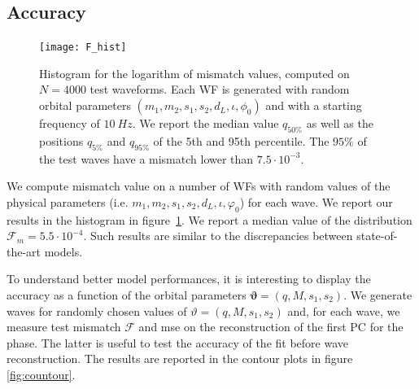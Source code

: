 \subsection{Accuracy}
\begin{figure}
	\centering
    \texttt{[image: F\_hist]}
	\caption{Histogram for the logarithm of mismatch values, computed on $N=4000$ test waveforms. Each WF is generated with random orbital parameters $(m_1,m_2, s_1, s_2, d_L, \iota, \phi_0)$ and with a starting frequency of $\SI{10}{Hz}$.
We report the median value $q_{50\%}$ as well as the positions $q_{5\%}$ and $q_{95\%}$ of the 5th and 95th percentile.
The $95\%$ of the test waves have a mismatch lower than $7.5 \cdot 10^{-3}$.
}
	\label{fig:F_hist}
\end{figure}
We compute mismatch value on a number of WFs with random values of the physical parameters (i.e. $m_1,m_2, s_1, s_2, d_L, \iota, \varphi_0$) for each wave.
We report our results in the histogram in figure~\ref{fig:F_hist}.
We report a median value of the distribution $\mathcal{F}_m = 5.5 \cdot {10^{-4}}$. Such results are similar to the discrepancies between state-of-the-art models.
\par
To understand better model performances, it is interesting to display the accuracy as a function of the orbital parameters $\boldsymbol{\vartheta} = (q,M,s_1,s_2)$.
We generate waves for randomly chosen values of $\vartheta = (q, M, s_1, s_2)$ and, for each wave, we measure test mismatch $\mathcal{F}$ and mse on the reconstruction of the first PC for the phase.
The latter is useful to test the accuracy of the fit before wave reconstruction.
The results are reported in the contour plots in figure \ref{fig:countour}.
\par

